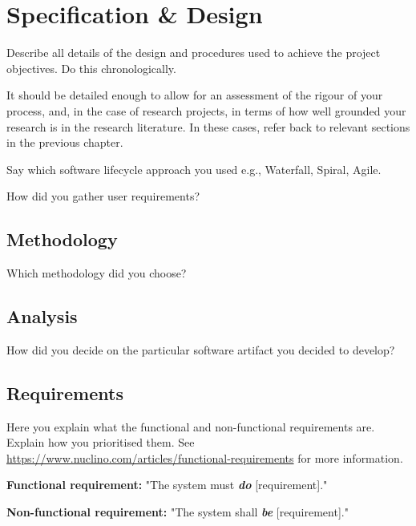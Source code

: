 
\section{Specification \& Design}\label{process}

Describe all details of the  design and procedures used to achieve the project objectives. Do this chronologically. 


It should be detailed enough to allow for an assessment of the rigour of your process, and, in the case of research projects, in terms of how well grounded your research is in the research literature. In these cases, refer back to relevant sections in the previous chapter.

Say which  software lifecycle approach you used e.g., Waterfall, Spiral, Agile. 

How did you gather user requirements?

\subsection{Methodology}
Which methodology did you choose?

\subsection{Analysis}
How did you decide on the particular software artifact you decided to develop?

\subsection{Requirements}
Here you explain what the functional and non-functional requirements are. Explain how you prioritised them. 
  See \url{https://www.nuclino.com/articles/functional-requirements} for more information. 

   \textbf{Functional requirement:} "The system must \textbf{\emph{do}} [requirement]."

    \textbf{Non-functional requirement:} "The system shall \textbf{\emph{be}} [requirement]."


